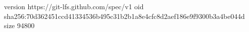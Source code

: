 version https://git-lfs.github.com/spec/v1
oid sha256:70d362451ccd41334536b495c31b2b1a8e4cfc8d2aef186e9f9300b3a4be044d
size 94800
